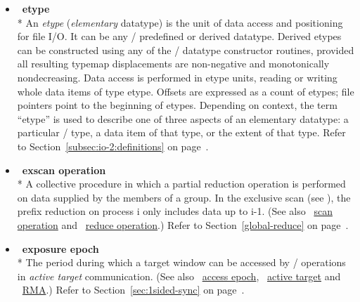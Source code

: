 \begin{itemize}
\label{glossary:etype}
\item  ~\hypertarget{glossary:etype}{\textbf{etype}} \\*
An {\it etype} ({\it elementary} datatype)
is the unit of data access and positioning for file I/O.
It can be any \MPI/ predefined or derived datatype.
Derived etypes can be constructed
using any of the \MPI/ datatype constructor routines,
provided all resulting typemap displacements are non-negative
and monotonically nondecreasing.
Data access is performed in etype units,
reading or writing whole data items of type etype.
Offsets are expressed as a count of etypes;
file pointers point to the beginning of etypes.
Depending on context,
the term ``etype'' is used to describe one of three aspects
of an elementary datatype:
a particular \MPI/ type,
a data item of that type,
or the extent of that type.
Refer to Section~\ref{subsec:io-2:definitions} on page~\pageref{subsec:io-2:definitions}.

\label{glossary:exscan_operation}
\item  ~\hypertarget{glossary:exscan_operation}{\textbf{exscan operation}} \\*
A collective procedure in which a partial reduction operation is performed on data supplied by the members of a group.
In the exclusive scan (see ), the prefix reduction on process i only includes data up to i-1. 
(See also ~\hyperlink{glossary:scan_operation}{scan operation} and
~\hyperlink{glossary:reduce_operation}{reduce operation}.)
Refer to Section~\ref{global-reduce} on page~\pageref{global-reduce}.

\label {glossary:exposure_epoch}
\item  ~\hypertarget{glossary:exposure_epoch}{\textbf{exposure epoch}} \\*
The period during which a target window can be accessed by \RMA/
operations in {\it active target} communication.
(See also ~\hyperlink{glossary:access_epoch}{access epoch},
~\hyperlink{glossary:active_target}{active target}
 and ~\hyperlink{glossary:RMA}{RMA}.)
Refer to Section~\ref{sec:1sided-sync} on page~\pageref{sec:1sided-sync}.


\end{itemize}
